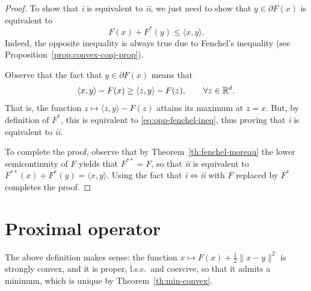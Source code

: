  \begin{proof}
     To show that \emph{i} is equivalent to \emph{ii}, we just need to show that $y\in \partial F(x)$ is equivalent to
     \begin{equation}
         \label{eq:opp-fenchel-ineq}
         F(x)+F^*(y) \le \langle  x,y\rangle.
     \end{equation}
     Indeed, the opposite inequality is always true due to Fenchel's inequality (see Proposition~\ref{prop:convex-conj-prop}).
 
     Observe that the fact that $y\in\partial F(x)$ means that
     \begin{equation}
         \langle x,y\rangle - F(x)
         \ge \langle z,y\rangle - F(z), \qquad \forall z\in \mathbb{R}^d.
     \end{equation}
     That is, the function $z\mapsto \langle z,y\rangle - F(z)$ attains its maximum at $z=x$. But, by definition of $F^*$, this is equivalent to \eqref{eq:opp-fenchel-ineq}, thus proving that \emph{i} is equivalent to \emph{ii}.
 
     To complete the proof, observe that by Theorem~\ref{th:fenchel-moreau} the lower semicontinuity of $F$ yields that $F^{**}=F$, so that \emph{ii} is equivalent to $F^{**}(x)+F^*(y)=\langle x,y\rangle$. Using the fact that \emph{i}$\iff$\emph{ii} with $F$ replaced by $F^*$ completes the proof.
 \end{proof}
 
 \section{Proximal operator}
 \label{sec:proximal}
 
 
 The above definition makes sense: the function $x\mapsto F(x) + \frac12 \|x-y\|^2$ is strongly convex, and it is proper, l.s.c.~and coercive, so that it admits a minimum, which is unique by Theorem~\ref{th:min-convex}.
 
 
